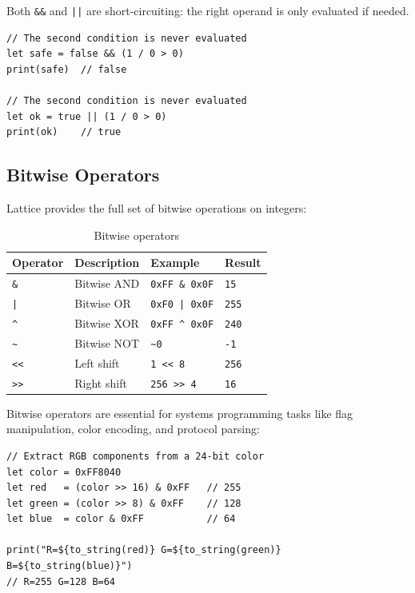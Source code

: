 Both \lstinline|&&| and \lstinline!||! are short-circuiting: the right operand is only evaluated if needed.

\begin{lstlisting}[language=Lattice, caption={Short-circuit evaluation}]
// The second condition is never evaluated
let safe = false && (1 / 0 > 0)
print(safe)  // false

// The second condition is never evaluated
let ok = true || (1 / 0 > 0)
print(ok)    // true
\end{lstlisting}

\subsection{Bitwise Operators}\label{subsec:bitwise}

Lattice provides the full set of bitwise operations on integers:

\begin{table}[h]
\centering
\begin{tabular}{llll}
\toprule
\textbf{Operator} & \textbf{Description} & \textbf{Example} & \textbf{Result} \\
\midrule
\lstinline|&| & Bitwise AND & \lstinline|0xFF & 0x0F| & \lstinline|15| \\
\lstinline!|! & Bitwise OR  & \lstinline!0xF0 | 0x0F! & \lstinline|255| \\
\lstinline|^| & Bitwise XOR & \lstinline|0xFF ^ 0x0F| & \lstinline|240| \\
\lstinline|~| & Bitwise NOT & \lstinline|~0| & \lstinline|-1| \\
\lstinline|<<| & Left shift  & \lstinline|1 << 8| & \lstinline|256| \\
\lstinline|>>| & Right shift & \lstinline|256 >> 4| & \lstinline|16| \\
\bottomrule
\end{tabular}
\caption{Bitwise operators}\label{tab:bitwise-operators}
\end{table}

Bitwise operators are essential for systems programming tasks like flag manipulation, color encoding, and protocol parsing:

\begin{lstlisting}[language=Lattice, caption={Bitwise operations in practice}]
// Extract RGB components from a 24-bit color
let color = 0xFF8040
let red   = (color >> 16) & 0xFF   // 255
let green = (color >> 8) & 0xFF    // 128
let blue  = color & 0xFF           // 64

print("R=${to_string(red)} G=${to_string(green)} B=${to_string(blue)}")
// R=255 G=128 B=64
\end{lstlisting}

